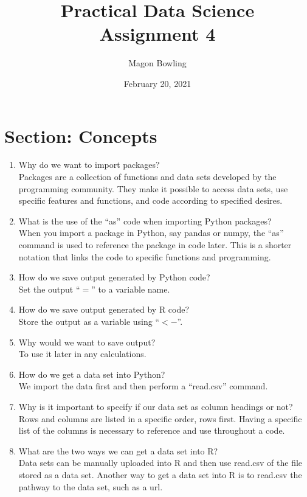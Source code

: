 \documentclass[11pt]{article}
\theoremstyle{definition}
\newcommand{\1}[1]{\mathbf{1} \left \{ #1 \right \}}
\begin{document}
\title{Practical Data Science \\ Assignment 4}
\author{Magon Bowling}
\date{February 20, 2021}

\maketitle

\section{Section: Concepts}
\begin{enumerate}
    \item Why do we want to import packages? \\
    Packages are a collection of functions and data sets developed by the programming community. They make it possible to access data sets, use specific features and functions, and code according to specified desires.
    \item What is the use of the “as” code when importing Python packages? \\
    When you import a package in Python, say pandas or numpy, the “as” command is used to reference the package in code later. This is a shorter notation that links the code to specific functions and programming.
    \item How do we save output generated by Python code? \\
    Set the output “$=$” to a variable name.
    \item How do we save output generated by R code? \\
    Store the output as a variable using “$<-$”.
    \item Why would we want to save output? \\
    To use it later in any calculations.
    \item How do we get a data set into Python? \\
    We import the data first and then perform a “read.csv” command.
    \item Why is it important to specify if our data set as column headings or not? \\
    Rows and columns are listed in a specific order, rows first. Having a specific list of the columns is necessary to reference and use throughout a code.
    \item What are the two ways we can get a data set into R? \\
    Data sets can be manually uploaded into R and then use read.csv of the file stored as a data set. Another way to get a data set into R is to read.csv the pathway to the data set, such as a url.
\end{enumerate}
\end{document}
